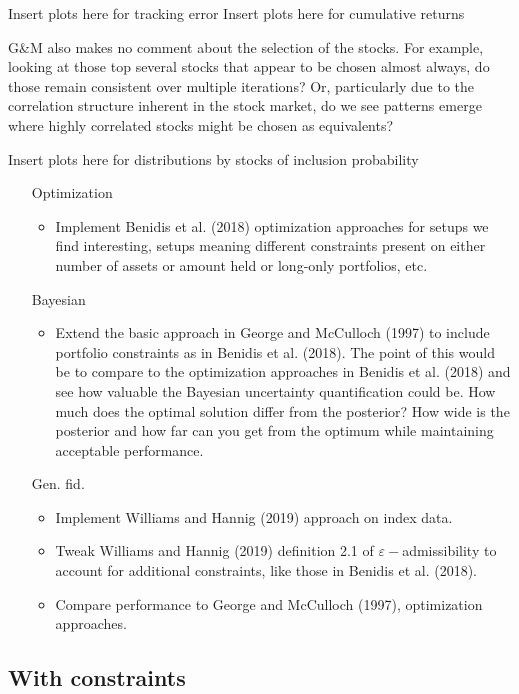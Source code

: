 \documentclass[a4paper, 12pt]{article}
\theoremstyle{plain}
\theoremstyle{definition}
\theoremstyle{remark}
\newcommand{\eps}{\varepsilon}
\begin{document}
{\color{red} Insert plots here for tracking error}
{\color{red} Insert plots here for cumulative returns}

G\&M also makes no comment about the selection of the stocks. For example, looking at those top several stocks that appear to be chosen almost always, do those remain consistent over multiple iterations? Or, particularly due to the correlation structure inherent in the stock market, do we see patterns emerge where highly correlated stocks might be chosen as equivalents?

{\color{red} Insert plots here for distributions by stocks of inclusion probability}



\begin{itemize}
	\item[Optimization]
		\begin{itemize}
		\item Implement Benidis et al. (2018) optimization approaches for setups we find interesting, setups meaning different constraints present on either number of assets or amount held or long-only portfolios, etc.
	\end{itemize}
	\item[Bayesian]
	\begin{itemize}
		\item Extend the basic approach in George and McCulloch (1997) to include portfolio constraints as in Benidis et al. (2018).  The point of this would be to compare to the optimization approaches in Benidis et al. (2018) and see how valuable the Bayesian uncertainty quantification could be.  How much does the optimal solution differ from the posterior?  How wide is the posterior and how far can you get from the optimum while maintaining acceptable performance.
	\end{itemize}
	\item[Gen. fid.]
		\begin{itemize}
			\item Implement Williams and Hannig (2019) approach on index data.
			\item Tweak Williams and Hannig (2019) definition 2.1 of $\eps-$admissibility to account for additional constraints, like those in Benidis et al. (2018).
			\item Compare performance to George and McCulloch (1997), optimization approaches.
	\end{itemize}
\end{itemize}

\subsection{With constraints}
\end{document}
